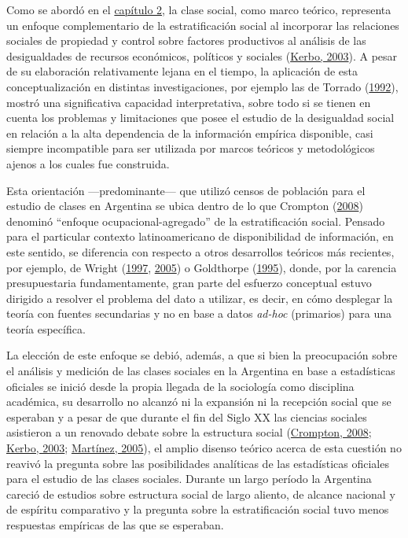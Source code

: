 \documentclass[
]{article}
\begin{document}
Como se abordó en el \protect\hyperlink{analisis1}{capítulo 2}, la clase social, como marco teórico, representa un enfoque complementario de la estratificación social al incorporar las relaciones sociales de propiedad y control sobre factores productivos al análisis de las desigualdades de recursos económicos, políticos y sociales (\protect\hyperlink{ref-Kerbo2003}{Kerbo, 2003}). A pesar de su elaboración relativamente lejana en el tiempo, la aplicación de esta conceptualización en distintas investigaciones, por ejemplo las de Torrado (\protect\hyperlink{ref-Torrado1992}{1992}), mostró una significativa capacidad interpretativa, sobre todo si se tienen en cuenta los problemas y limitaciones que posee el estudio de la desigualdad social en relación a la alta dependencia de la información empírica disponible, casi siempre incompatible para ser utilizada por marcos teóricos y metodológicos ajenos a los cuales fue construida.

Esta orientación ---predominante--- que utilizó censos de población para el estudio de clases en Argentina se ubica dentro de lo que Crompton (\protect\hyperlink{ref-Crompton2008}{2008}) denominó ``enfoque ocupacional-agregado'' de la estratificación social. Pensado para el particular contexto latinoamericano de disponibilidad de información, en este sentido, se diferencia con respecto a otros desarrollos teóricos más recientes, por ejemplo, de Wright (\protect\hyperlink{ref-Wright1997}{1997}, \protect\hyperlink{ref-Wright2005}{2005}) o Goldthorpe (\protect\hyperlink{ref-Goldthorpe1995}{1995}), donde, por la carencia presupuestaria fundamentamente, gran parte del esfuerzo conceptual estuvo dirigido a resolver el problema del dato a utilizar, es decir, en cómo desplegar la teoría con fuentes secundarias y no en base a datos \emph{ad-hoc} (primarios) para una teoría específica.

La elección de este enfoque se debió, además, a que si bien la preocupación sobre el análisis y medición de las clases sociales en la Argentina en base a estadísticas oficiales se inició desde la propia llegada de la sociología como disciplina académica, su desarrollo no alcanzó ni la expansión ni la recepción social que se esperaban y a pesar de que durante el fin del Siglo XX las ciencias sociales asistieron a un renovado debate sobre la estructura social (\protect\hyperlink{ref-Crompton2008}{Crompton, 2008}; \protect\hyperlink{ref-Kerbo2003}{Kerbo, 2003}; \protect\hyperlink{ref-Martinez2005}{Martínez, 2005}), el amplio disenso teórico acerca de esta cuestión no reavivó la pregunta sobre las posibilidades analíticas de las estadísticas oficiales para el estudio de las clases sociales. Durante un largo período la Argentina careció de estudios sobre estructura social de largo aliento, de alcance nacional y de espíritu comparativo y la pregunta sobre la estratificación social tuvo menos respuestas empíricas de las que se esperaban.
\end{document}

